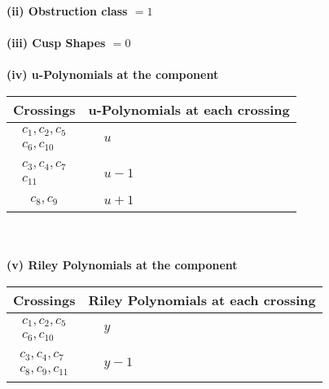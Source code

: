 \documentclass[1p]{elsarticle_modified}
\theoremstyle{definition}
\begin{document}
\flushleft \textbf{(ii) Obstruction class $= 1$}\\~\\
\flushleft \textbf{(iii) Cusp Shapes $= 0$}\\~\\
\newpage\renewcommand{\arraystretch}{1}
\flushleft \textbf{(iv) u-Polynomials at the component}\newline \\
\begin{tabular}{m{50pt}|m{274pt}}
Crossings & \hspace{64pt}u-Polynomials at each crossing \\
\hline $$\begin{aligned}c_{1},c_{2},c_{5}\\c_{6},c_{10}\end{aligned}$$&$\begin{aligned}
&u
\end{aligned}$\\
\hline $$\begin{aligned}c_{3},c_{4},c_{7}\\c_{11}\end{aligned}$$&$\begin{aligned}
&u-1
\end{aligned}$\\
\hline $$\begin{aligned}c_{8},c_{9}\end{aligned}$$&$\begin{aligned}
&u+1
\end{aligned}$\\
\hline
\end{tabular}\\~\\
\newpage\renewcommand{\arraystretch}{1}
\flushleft \textbf{(v) Riley Polynomials at the component}\newline \\
\begin{tabular}{m{50pt}|m{274pt}}
Crossings & \hspace{64pt}Riley Polynomials at each crossing \\
\hline $$\begin{aligned}c_{1},c_{2},c_{5}\\c_{6},c_{10}\end{aligned}$$&$\begin{aligned}
&y
\end{aligned}$\\
\hline $$\begin{aligned}c_{3},c_{4},c_{7}\\c_{8},c_{9},c_{11}\end{aligned}$$&$\begin{aligned}
&y-1
\end{aligned}$\\
\hline
\end{tabular}\\~\\
\end{document}
